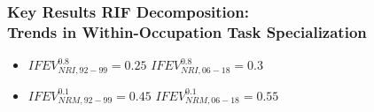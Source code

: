 \documentclass[10pt]{beamer}
\begin{document}

\begin{frame}
	\frametitle{Key Results RIF Decomposition: \\ Trends in Within-Occupation Task Specialization}
	
	
\def\HS{\hspace{\fontdimen2\font}}

\begin{itemize} 
	\item $IFEV_{NRI, 92-99}^{0.8} = 0.25$ \HS\HS\HS\HS\HS $IFEV_{NRI, 06-18}^{0.8} = 0.3$
	\item $IFEV_{NRM, 92-99}^{0.1} = 0.45$ \HS\HS\HS
	 $IFEV_{NRM, 06-18}^{0.1} = 0.55$ 
\end{itemize} 

	
\end{frame}





\end{document}
